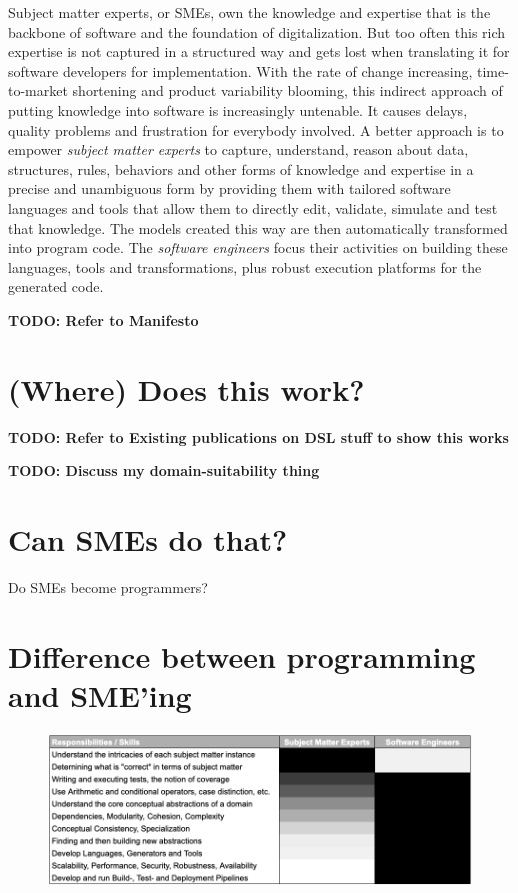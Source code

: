 \documentclass[runningheads]{llncs}
\newcommand\todo[1]{\vspace{1mm}\noindent\textbf{\color{red} {{TODO: {#1}} }}}
\begin{document}
Subject matter experts, or SMEs, own the knowledge and expertise that is the
backbone of software and the foundation of digitalization. But too often this
rich expertise is not captured in a structured way and gets lost when
translating it for software developers for implementation. With the rate of
change increasing, time-to-market shortening and product variability blooming,
this indirect approach of putting knowledge into software is increasingly
untenable. It causes delays, quality problems and frustration for everybody
involved. A better approach is to empower \emph{subject matter experts} to
capture, understand, reason about data, structures, rules, behaviors and other
forms of knowledge and expertise in a precise and unambiguous form by providing
them with tailored software languages and tools that allow them to directly
edit, validate, simulate and test that knowledge. The models created this way
are then automatically transformed into program code. The \emph{software
engineers} focus their activities on building these languages, tools and
transformations, plus robust execution platforms for the generated code.

\todo{Refer to Manifesto}

\section{(Where) Does this work?}

\todo{Refer to Existing publications on DSL stuff to show this works}

\todo{Discuss my domain-suitability thing}


\section{Can SMEs do that?}

Do SMEs become programmers?
 

\section{Difference between programming and SME'ing}


\begin{figure}
\begin{center}
    \includegraphics[width=1\columnwidth]{figures/table-respo.png}
    \caption{}
    \label{table-respo}
\end{center} 
\end{figure} 
\end{document}
